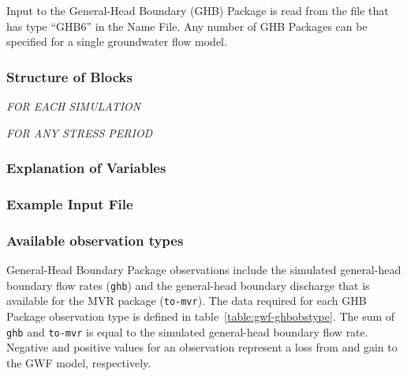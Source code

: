 Input to the General-Head Boundary (GHB) Package is read from the file that has type ``GHB6'' in the Name File.  Any number of GHB Packages can be specified for a single groundwater flow model.

\vspace{5mm}
\subsubsection{Structure of Blocks}
\vspace{5mm}

\noindent \textit{FOR EACH SIMULATION}


\vspace{5mm}
\noindent \textit{FOR ANY STRESS PERIOD}

\packageperioddescription

\vspace{5mm}
\subsubsection{Explanation of Variables}
\begin{description}

\end{description}

\vspace{5mm}
\subsubsection{Example Input File}


\vspace{5mm}
\subsubsection{Available observation types}
General-Head Boundary Package observations include the simulated general-head boundary flow rates (\texttt{ghb}) and the general-head boundary discharge that is available for the MVR package (\texttt{to-mvr}). The data required for each GHB Package observation type is defined in table~\ref{table:gwf-ghbobstype}. The sum of \texttt{ghb} and \texttt{to-mvr} is equal to the simulated general-head boundary flow rate. Negative and positive values for an observation represent a loss from and gain to the GWF model, respectively.

